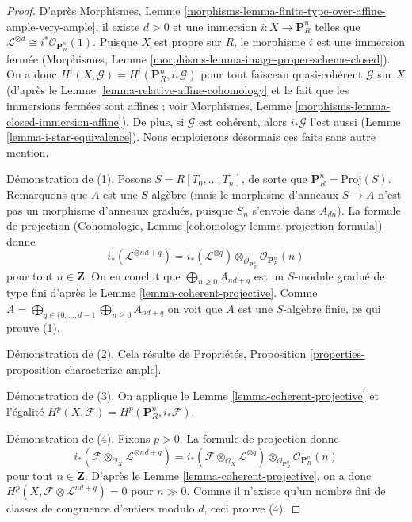 \begin{proof}
D'après Morphismes, Lemme
\ref{morphisms-lemma-finite-type-over-affine-ample-very-ample}, il existe
$d > 0$ et une immersion $i : X \to \mathbf{P}^n_R$ telles que
$\mathcal{L}^{\otimes d} \cong i^*\mathcal{O}_{\mathbf{P}^n_R}(1)$.
Puisque $X$ est propre sur $R$, le morphisme $i$ est une immersion fermée
(Morphismes, Lemme \ref{morphisms-lemma-image-proper-scheme-closed}).
On a donc $H^i(X, \mathcal{G}) = H^i(\mathbf{P}^n_R, i_*\mathcal{G})$
pour tout faisceau quasi-cohérent $\mathcal{G}$ sur $X$ (d'après le Lemme
\ref{lemma-relative-affine-cohomology} et le fait que les immersions fermées
sont affines ; voir Morphismes, Lemme
\ref{morphisms-lemma-closed-immersion-affine}).
De plus, si $\mathcal{G}$ est cohérent, alors $i_*\mathcal{G}$ l'est aussi
(Lemme \ref{lemma-i-star-equivalence}). Nous emploierons désormais ces faits
sans autre mention.

\medskip\noindent
Démonstration de (1). Posons $S = R[T_0, \ldots, T_n]$, de sorte que
$\mathbf{P}^n_R = \text{Proj}(S)$.
Remarquons que $A$ est une $S$-algèbre (mais le morphisme d'anneaux
$S \to A$ n'est pas un morphisme d'anneaux gradués, puisque $S_n$ s'envoie
dans $A_{dn}$). La formule de projection (Cohomologie, Lemme
\ref{cohomology-lemma-projection-formula}) donne
$$
i_*(\mathcal{L}^{\otimes nd + q}) =
i_*(\mathcal{L}^{\otimes q})
\otimes_{\mathcal{O}_{\mathbf{P}^n_R}}
\mathcal{O}_{\mathbf{P}^n_R}(n)
$$
pour tout $n \in \mathbf{Z}$. On en conclut que
$\bigoplus_{n \geq 0} A_{nd + q}$ est un $S$-module gradué de type fini d'après
le Lemme \ref{lemma-coherent-projective}.
Comme
$A = \bigoplus_{q \in \{0, \ldots, d - 1} \bigoplus_{n \geq 0} A_{nd + q}$
on voit que $A$ est une $S$-algèbre finie, ce qui prouve (1).

\medskip\noindent
Démonstration de (2). Cela résulte de Propriétés, Proposition
\ref{properties-proposition-characterize-ample}.

\medskip\noindent
Démonstration de (3). On applique le Lemme
\ref{lemma-coherent-projective} et l'égalité
$H^p(X, \mathcal{F}) = H^p(\mathbf{P}^n_R, i_*\mathcal{F})$.

\medskip\noindent
Démonstration de (4). Fixons $p > 0$. La formule de projection donne
$$
i_*(\mathcal{F} \otimes_{\mathcal{O}_X} \mathcal{L}^{\otimes nd + q}) =
i_*(\mathcal{F} \otimes_{\mathcal{O}_X} \mathcal{L}^{\otimes q})
\otimes_{\mathcal{O}_{\mathbf{P}^n_R}}
\mathcal{O}_{\mathbf{P}^n_R}(n)
$$
pour tout $n \in \mathbf{Z}$. D'après le Lemme
\ref{lemma-coherent-projective}, on a donc
$H^p(X, \mathcal{F} \otimes \mathcal{L}^{nd + q}) = 0$ pour $n \gg 0$.
Comme il n'existe qu'un nombre fini de classes de congruence d'entiers modulo
$d$, ceci prouve (4).


\end{proof}
